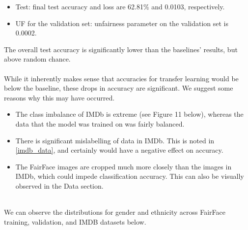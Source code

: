 \begin{itemize}

\item Test: final test accuracy and loss are 62.81$\%$ and 0.0103, respectively.

\item UF for the validation set: unfairness parameter on the validation set is 0.0002.   
\end{itemize}

The overall test accuracy is significantly lower than the baselines' results, but above random chance.
\\
\\
While it inherently makes sense that accuracies for transfer learning would be below the baseline, these drops in accuracy are significant. We suggest some reasons why this may have occurred.
\begin{itemize}
\item The class imbalance of IMDb is extreme (see Figure 11 below), whereas the data that the model was trained on was fairly balanced.
\item There is significant mislabelling of data in IMDb. This is noted in \ref{imdb_data}, and certainly would have a negative effect on accuracy.
\item The FairFace images are cropped much more closely than the images in IMDb, which could impede classification accuracy. This can also be visually observed in the Data section.
\end{itemize}
\\
We can observe the distributions for gender and ethnicity across FairFace training, validation, and IMDB datasets below.
